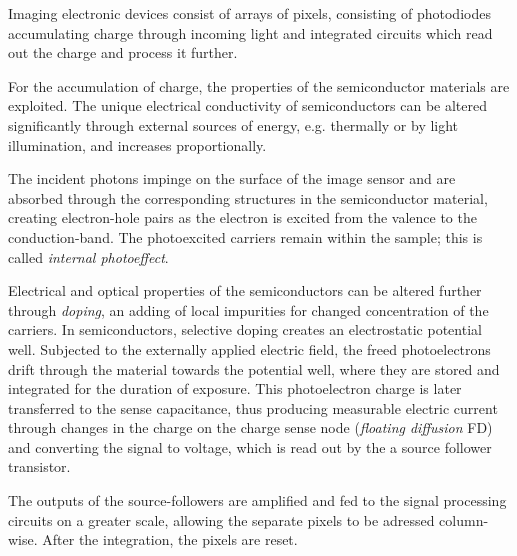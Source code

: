 Imaging electronic devices consist of arrays of pixels, consisting of photodiodes accumulating charge through incoming light and integrated circuits which read out the charge and process it further.

For the accumulation of charge, the properties of the semiconductor materials are exploited. 
The unique electrical conductivity of semiconductors can be altered significantly through external sources of energy, e.g. thermally or by light illumination, and increases proportionally. 

The incident photons impinge on the surface of the image sensor and are absorbed through the corresponding structures in the semiconductor material, creating electron-hole pairs as the electron is excited from the valence to the conduction-band. The photoexcited carriers remain within the sample; this is called \textit{internal photoeffect}. \cite{Saleh1991} %

Electrical and optical properties of the semiconductors can be altered further through \textit{doping}, an adding of local impurities for changed concentration of the carriers. In semiconductors, selective doping creates an electrostatic potential well. Subjected to the externally applied electric field, the freed photoelectrons drift through the material towards the potential well, where they are stored and integrated for the duration of exposure. This photoelectron charge is later transferred to the sense capacitance, thus producing measurable electric current through changes in the charge on the charge sense node (\textit{floating diffusion} FD) and converting the signal to voltage, which is read out by the a source follower transistor. \cite{9059308} %

The outputs of the source-followers are amplified and fed to the signal processing circuits on a greater scale, allowing the separate pixels to be adressed column-wise. After the integration, the pixels are reset.

